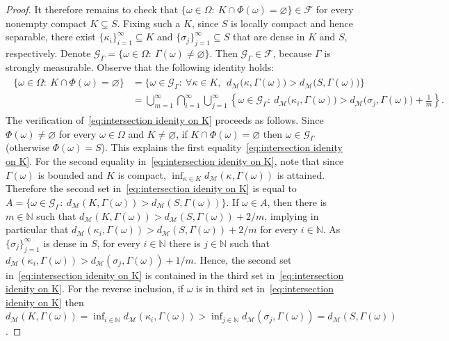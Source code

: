 \documentclass[11pt,reqno]{amsart}
\theoremstyle{remark}
\newcommand{\MM}{\mathcal{M}}
\renewcommand{\subset}{\subseteq}
\newcommand{\N}{\mathbb N}
\renewcommand{\emptyset}{\varnothing}
\renewcommand{\1}{\mathbf 1}
\newcommand{\cG}{\mathscr{G}}
\begin{document}
\begin{proof}
It therefore remains to check that $\{\omega\in \Omega:\ K\cap \Phi(\omega)= \emptyset\}\in \mathscr{F}$ for every nonempty compact $K\subsetneq S$. Fixing such a $K$, since $S$  is locally compact and hence separable, there exist $\{\kappa_i\}_{i=1}^\infty\subset K$ and $\{\sigma_j\}_{j=1}^\infty\subset S$ that are dense in $K$ and $S$, respectively. Denote $\cG_\Gamma=\{\omega\in \Omega:\ \Gamma(\omega)\neq \emptyset\}$. Then $\cG_\Gamma\in \mathscr{F}$, because $\Gamma$ is strongly measurable. Observe that the following identity holds:
\begin{align}\label{eq:intersection idenity on K}
\begin{split}
 \big\{\omega\in \Omega:\ K\cap \Phi(\omega)= \emptyset\big\}&=\Big\{\omega\in \cG_\Gamma:\ \forall  \kappa\in K,\ \  d_\MM\big(\kappa,\Gamma(\omega)\big)>d_\MM\big(S,\Gamma(\omega)\big)\Big\}\\
&=\bigcup_{m=1}^\infty \bigcap_{i=1}^\infty\bigcup_{j=1}^\infty  \left\{\omega\in \cG_\Gamma:\ d_\MM\big(\kappa_i,\Gamma(\omega)\big)>d_\MM\big(\sigma_j,\Gamma(\omega)\big)+\frac{1}{m}\right\}.
\end{split}
\end{align}
The  verification of~\eqref{eq:intersection idenity on K} proceeds as follows. Since $\Phi(\omega)\neq \emptyset$ for every $\omega\in \Omega$ and $K\neq \emptyset$, if $K\cap \Phi(\omega)= \emptyset$ then  $\omega\in \cG_\Gamma$ (otherwise $\Phi(\omega)=S$).   This explains the first equality~\eqref{eq:intersection idenity on K}. For the second equality in~\eqref{eq:intersection idenity on K}, note that since $\Gamma(\omega)$ is bounded and $K$ is compact, $\inf_{\kappa\in K} d_\MM(\kappa,\Gamma(\omega))$ is attained. Therefore the second set in~\eqref{eq:intersection idenity on K} is equal to $A=\{\omega\in \cG_\Gamma:\ d_\MM(K,\Gamma(\omega))>d_\MM(S,\Gamma(\omega))\}$. If $\omega\in A$, then there is $m\in   \N$ such that $d_\MM(K,\Gamma(\omega))>d_\MM(S,\Gamma(\omega))+2/m$, implying in particular that $d_\MM(\kappa_i,\Gamma(\omega))>d_\MM(S,\Gamma(\omega))+2/m$ for every $i\in \N$. As $\{\sigma_j\}_{j=1}^\infty$ is dense in $S$, for every $i\in \N$ there is $j\in \N$ such that $d_\MM(\kappa_i,\Gamma(\omega))>d_\MM(\sigma_j,\Gamma(\omega))+1/m$. Hence, the second set in~\eqref{eq:intersection idenity on K} is contained in the third set in~\eqref{eq:intersection idenity on K}. For the reverse inclusion, if $\omega$ is in third set in~\eqref{eq:intersection idenity on K} then  $d_\MM(K,\Gamma(\omega))=\inf_{i\in \N}  d_\MM(\kappa_i,\Gamma(\omega))> \inf_{j\in \N} d_\MM(\sigma_j,\Gamma(\omega))= d_\MM(S,\Gamma(\omega))$.


\end{proof}
\end{document}

